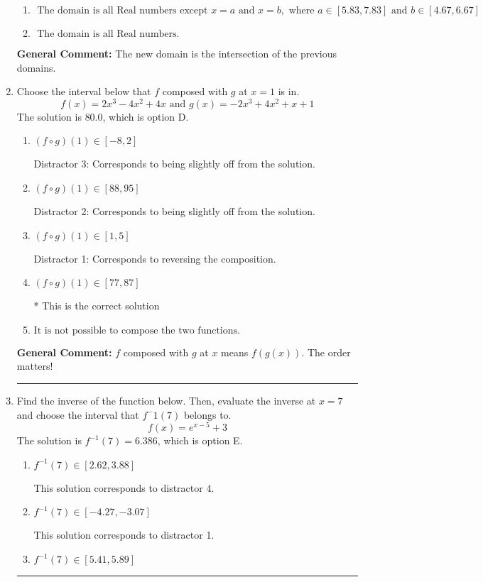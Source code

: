 \documentclass{extbook}[14pt]
\newcommand{\litem}[1]{\item #1

\rule{\textwidth}{0.4pt}}
\begin{document}
\begin{enumerate}
{\begin{enumerate}[label=\Alph*.]
\item \( \text{ The domain is all Real numbers except } x = a \text{ and } x = b, \text{ where } a \in [5.83, 7.83] \text{ and } b \in [4.67, 6.67] \)


\item \( \text{ The domain is all Real numbers. } \)


\end{enumerate}

\textbf{General Comment:} The new domain is the intersection of the previous domains.
}
\litem{
Choose the interval below that $f$ composed with $g$ at $x=1$ is in.
\[ f(x) = 2x^{3} -4 x^{2} +4 x \text{ and } g(x) = -2x^{3} +4 x^{2} +x + 1 \]The solution is \( 80.0 \), which is option D.\begin{enumerate}[label=\Alph*.]
\item \( (f \circ g)(1) \in [-8, 2] \)

 Distractor 3: Corresponds to being slightly off from the solution.
\item \( (f \circ g)(1) \in [88, 95] \)

 Distractor 2: Corresponds to being slightly off from the solution.
\item \( (f \circ g)(1) \in [1, 5] \)

 Distractor 1: Corresponds to reversing the composition.
\item \( (f \circ g)(1) \in [77, 87] \)

* This is the correct solution
\item \( \text{It is not possible to compose the two functions.} \)


\end{enumerate}

\textbf{General Comment:} $f$ composed with $g$ at $x$ means $f(g(x))$. The order matters!
}
\litem{
Find the inverse of the function below. Then, evaluate the inverse at $x = 7$ and choose the interval that $f^-1(7)$ belongs to.
\[ f(x) = e^{x-5}+3 \]The solution is \( f^{-1}(7) = 6.386 \), which is option E.\begin{enumerate}[label=\Alph*.]
\item \( f^{-1}(7) \in [2.62, 3.88] \)

 This solution corresponds to distractor 4.
\item \( f^{-1}(7) \in [-4.27, -3.07] \)

 This solution corresponds to distractor 1.
\item \( f^{-1}(7) \in [5.41, 5.89] \)


\end{enumerate}}
\end{enumerate}
\end{document}
